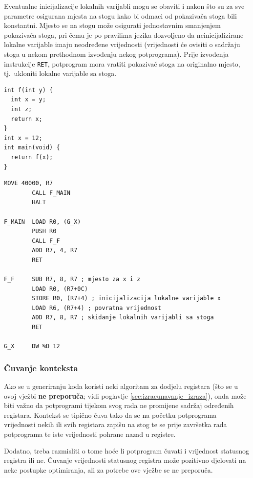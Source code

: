 \documentclass[times, 12pt, utf8]{book}
\begin{document}
Eventualne inicijalizacije lokalnih varijabli mogu se obaviti i nakon što su za sve parametre osigurana mjesta na stogu kako bi odmaci od pokazivača stoga bili konstantni.
Mjesto se na stogu može osigurati jednostavnim smanjenjem pokazivača stoga, pri čemu je po pravilima jezika dozvoljeno da neinicijalizirane lokalne varijable imaju neodređene vrijednosti (vrijednosti će ovisiti o sadržaju stoga u nekom prethodnom izvođenju nekog potprograma).
Prije izvođenja instrukcije \verb|RET|, potprogram mora vratiti pokazivač stoga na originalno mjesto, tj.~ukloniti lokalne varijable sa stoga.

\begin{lstlisting}[caption={Funkcija s lokalnom varijablom.},label=lst:primjer_lokalna_varijabla]
int f(int y) {
  int x = y;
  int z;
  return x;
}
int x = 12;
int main(void) {
  return f(x);
}
\end{lstlisting}

\begin{lstlisting}[caption={Mogući generirani FRISC mnemonički program za ispis \ref{lst:primjer_lokalna_varijabla}.},label=lst:primjer_lokalna_varijabla_frisc]
        MOVE 40000, R7
        CALL F_MAIN
        HALT
        
F_MAIN  LOAD R0, (G_X)
        PUSH R0
        CALL F_F
        ADD R7, 4, R7
        RET

F_F     SUB R7, 8, R7 ; mjesto za x i z
        LOAD R0, (R7+0C)
        STORE R0, (R7+4) ; inicijalizacija lokalne varijable x
        LOAD R6, (R7+4) ; povratna vrijednost
        ADD R7, 8, R7 ; skidanje lokalnih varijabli sa stoga
        RET

G_X     DW %D 12
\end{lstlisting}

\subsubsection{Čuvanje konteksta}
Ako se u generiranju koda koristi neki algoritam za dodjelu registara (što se u ovoj vježbi \textbf{ne preporuča}; vidi poglavlje \ref{sec:izracunavanje_izraza}), onda može biti važno da potprogrami tijekom svog rada ne promijene sadržaj određenih registara.
Kontekst se tipično čuva tako da se na početku potprograma vrijednosti nekih ili svih registara zapišu na stog te se prije završetka rada potprograma te iste vrijednosti pohrane nazad u registre.

Dodatno, treba razmisliti o tome hoće li potprogram čuvati i vrijednost statusnog registra ili ne.
Čuvanje vrijednosti statusnog registra može pozitivno djelovati na neke postupke optimiranja, ali za potrebe ove vježbe se ne preporuča.
\end{document}

